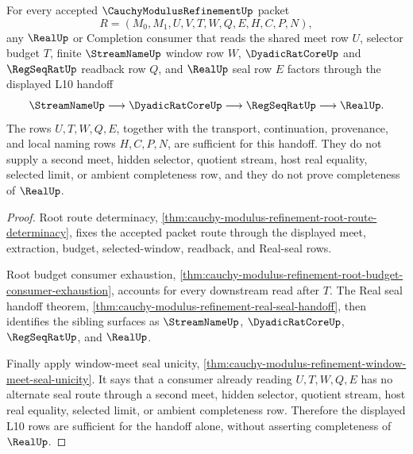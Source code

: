 \begin{theorem}
\label{thm:cauchy-modulus-refinement-l10-handoff-sufficiency}
For every accepted $\CauchyModulusRefinementUp$ packet
$$
R=(M_0,M_1,U,V,T,W,Q,E,H,C,P,N),
$$
any $\RealUp$ or Completion consumer that reads the shared meet row $U$, selector budget $T$, finite $\StreamNameUp$ window row $W$, $\DyadicRatCoreUp$ and $\RegSeqRatUp$ readback row $Q$, and $\RealUp$ seal row $E$ factors through the displayed L10 handoff
$$
\StreamNameUp \longrightarrow \DyadicRatCoreUp \longrightarrow \RegSeqRatUp \longrightarrow \RealUp.
$$
The rows $U,T,W,Q,E$, together with the transport, continuation, provenance, and local naming rows $H,C,P,N$, are sufficient for this handoff. They do not supply a second meet, hidden selector, quotient stream, host real equality, selected limit, or ambient completeness row, and they do not prove completeness of $\RealUp$.
\end{theorem}
\begin{proof}
Root route determinacy, \autoref{thm:cauchy-modulus-refinement-root-route-determinacy}, fixes the accepted packet route through the displayed meet, extraction, budget, selected-window, readback, and Real-seal rows.

Root budget consumer exhaustion, \autoref{thm:cauchy-modulus-refinement-root-budget-consumer-exhaustion}, accounts for every downstream read after $T$. The Real seal handoff theorem, \autoref{thm:cauchy-modulus-refinement-real-seal-handoff}, then identifies the sibling surfaces as $\StreamNameUp$, $\DyadicRatCoreUp$, $\RegSeqRatUp$, and $\RealUp$.

Finally apply window-meet seal unicity, \autoref{thm:cauchy-modulus-refinement-window-meet-seal-unicity}. It says that a consumer already reading $U,T,W,Q,E$ has no alternate seal route through a second meet, hidden selector, quotient stream, host real equality, selected limit, or ambient completeness row. Therefore the displayed L10 rows are sufficient for the handoff alone, without asserting completeness of $\RealUp$.
\end{proof}

